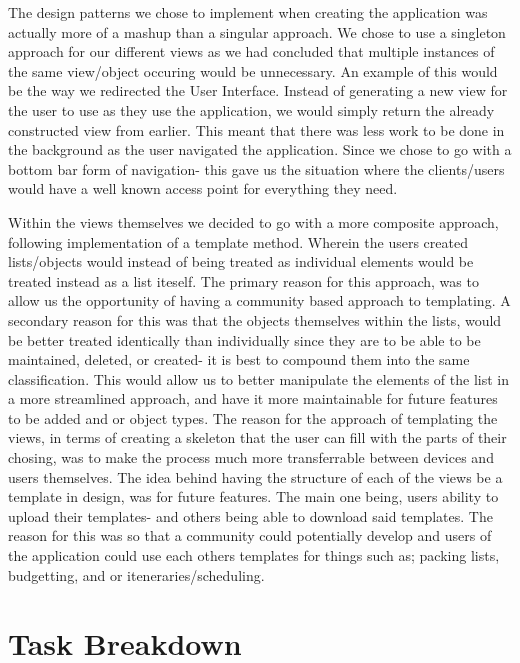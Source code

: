 \documentclass[12pt]{article}
\begin{document}
	The design patterns we chose to implement when creating the application was actually more of a mashup than a singular approach. We chose to use a singleton approach
	for our different views as we had concluded that multiple instances of the same view/object occuring would be unnecessary. An example of this would be the way we redirected
	the User Interface. Instead of generating a new view for the user to use as they use the application, we would simply return the already constructed view from earlier.
	This meant that there was less work to be done in the background as the user navigated the application. Since we chose to go with a bottom bar form of navigation-
	this gave us the situation where the clients/users would have a well known access point for everything they need.

	Within the views themselves we decided to go with a more composite approach, following implementation of a template method. Wherein the users created lists/objects would instead of being treated as
	individual elements would be treated instead as a list iteself. The primary reason for this approach, was to allow us the opportunity of having a community based approach to templating.
	A secondary reason for this was that the objects themselves within the lists, would be better treated identically than individually since they are to be able to be maintained,
	deleted, or created- it is best to compound them into the same classification. This would allow us to better manipulate the elements of the list in a more streamlined approach,
	and have it more maintainable for future features to be added and or object types. The reason for the approach of templating the views, in terms of creating a skeleton that the user can
	fill with the parts of their chosing, was to make the process much more transferrable between devices and users themselves. The idea behind having the structure of each of the views
	be a template in design, was for future features. The main one being, users ability to upload their templates- and others being able to download said templates. The reason for this was
	so that a community could potentially develop and users of the application could use each others templates for things such as; packing lists, budgetting, and or iteneraries/scheduling.

	\pagebreak
	\section*{Task Breakdown}
\end{document}
